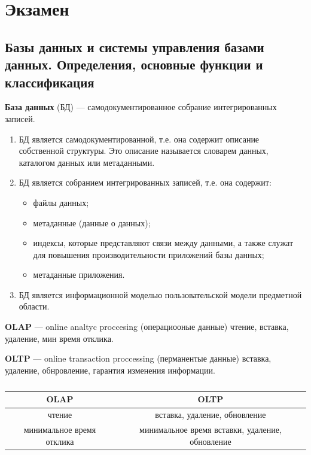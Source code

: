 \section{Экзамен}

\subsection{Базы данных и системы управления базами данных. Определения, основные функции и классификация}

\textbf{База данных} (БД) ---  самодокументированное собрание интегрированных записей.

\begin{enumerate}
	\item БД является самодокументированной, т.е. она содержит описание собственной структуры. Это описание называется словарем данных, каталогом данных или метаданными.
	\item БД является собранием интегрированных записей, т.е. она содержит:
	\begin{itemize}
		\item файлы данных;
		\item метаданные (данные о данных);
		\item индексы, которые представляют связи между данными, а также служат для повышения производительности приложений базы данных;
		\item метаданные приложения.
	\end{itemize}
	\item БД является информационной моделью пользовательской модели предметной области.
\end{enumerate}

\textbf{OLAP} --- online analtyc proccesing (операциооные данные) чтение, вставка, удаление, мин время отклика.

\textbf{OLTP} --- online transaction proccessing (перманентые данные) вставка, удаление, обнровление, гарантия изменения информации.

\begin{table}[ht!]
	\begin{center}
		\caption{}
		\label{tbl:best}
		\begin{tabular}{|c|c|}
			\hline
			OLAP & OLTP \\
			\hline
			чтение & вставка, удаление, обновление \\
			\hline
			минимальное время отклика & минимальное время вставки, удаление, обновление \\
			\hline
		\end{tabular}
	\end{center}
\end{table}

